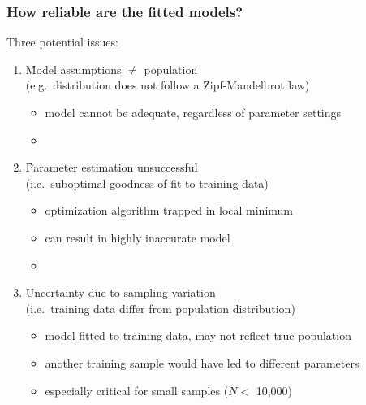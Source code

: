 \documentclass[t]{beamer} %
\begin{document}
\begin{frame}
  \frametitle{How reliable are the fitted models?}
  
  Three potential issues:
  \begin{enumerate}
  \item<2-> \h<5->{Model assumptions $\neq$ population}\\
    (e.g.\ distribution does not follow a Zipf-Mandelbrot law)
    \begin{itemize}
    \item[\hand] model cannot be adequate, regardless of parameter settings
    \item[]
    \end{itemize}
  \item<3-> \h<5->{Parameter estimation unsuccessful}\\
    (i.e.\ suboptimal goodness-of-fit to training data)
    \begin{itemize}
    \item[\hand] optimization algorithm trapped in local minimum
    \item[\hand] can result in highly inaccurate model
    \item[]
    \end{itemize}
  \item<4-> Uncertainty due to sampling variation\\
    (i.e.\ training data differ from population distribution)
    \begin{itemize}
    \item[\hand] model fitted to training data, may not reflect true population
    \item[\hand] another training sample would have led to different parameters
    \item[\hand] especially critical for small samples ($N < $ 10,000)
    \end{itemize}
  \end{enumerate}
\end{frame}
\end{document}
